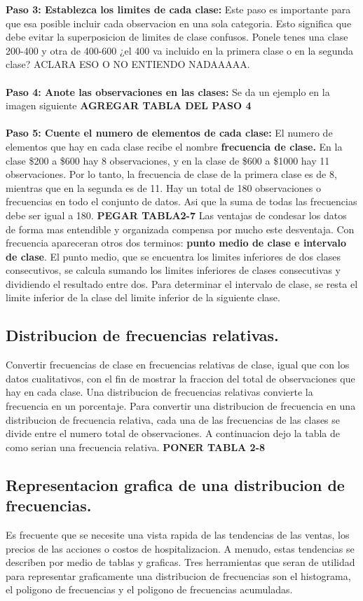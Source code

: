 \documentclass[]{article}
\begin{document}
\textbf{Paso 3: Establezca los limites de cada clase:} Este paso es importante para que esa posible incluir cada observacion en una sola categoria. Esto significa que debe evitar la superposicion de limites de clase confusos. Ponele tenes una clase 200-400 y otra de 400-600 ¿el 400 va incluido en la primera clase o en la segunda clase? ACLARA ESO O NO ENTIENDO NADAAAAA.\\\\
\textbf{Paso 4: Anote las observaciones en las clases:} Se da un ejemplo en la imagen siguiente \textbf{AGREGAR TABLA DEL PASO 4}\\\\
\textbf{Paso 5: Cuente el numero de elementos de cada clase:} El numero de elementos que hay en cada clase recibe el nombre \textbf{frecuencia de clase.} En la clase \$200 a \$600 hay 8 observaciones, y en la clase de \$600 a \$1000 hay 11 observaciones. Por lo tanto, la frecuencia de clase de la primera clase es de 8, mientras que en la segunda es de 11. Hay un total de 180 observaciones o frecuencias en todo el conjunto de datos. Asi que la suma de todas las frecuencias debe ser igual a 180. \textbf{PEGAR TABLA2-7}
Las ventajas de condesar los datos de forma mas entendible y organizada compensa por mucho este desventaja. \linebreak[2]
Con frecuencia apareceran otros dos terminos: \textbf{punto medio de clase e intervalo de clase}. El punto medio, que se encuentra los limites inferiores de dos clases consecutivos, se calcula sumando los limites inferiores de clases consecutivas y dividiendo el resultado entre dos. Para determinar el intervalo de clase, se resta el limite inferior de la clase del limite inferior de la siguiente clase.
\subsection{Distribucion de frecuencias relativas.}
Convertir frecuencias de clase en frecuencias relativas de clase, igual que con los datos cualitativos, con el fin de mostrar la fraccion del total de observaciones que hay en cada clase. Una distribucion de frecuencias relativas convierte la frecuencia en un porcentaje. Para convertir una distribucion de frecuencia en una distribucion de frecuencia relativa, cada una de las frecuencias de las clases se divide entre el numero total de observaciones. A continuacion dejo la tabla de como serian una frecuencia relativa. \textbf{PONER TABLA 2-8}
\subsection{Representacion grafica de una distribucion de frecuencias.}
Es frecuente que se necesite una vista rapida de las tendencias de las ventas, los precios de las acciones o costos de hospitalizacion. A menudo, estas tendencias se describen por medio de tablas y graficas. Tres herramientas que seran de utilidad para representar graficamente una distribucion de frecuencias son el histograma, el poligono de frecuencias y el poligono de frecuencias acumuladas.
\end{document}
